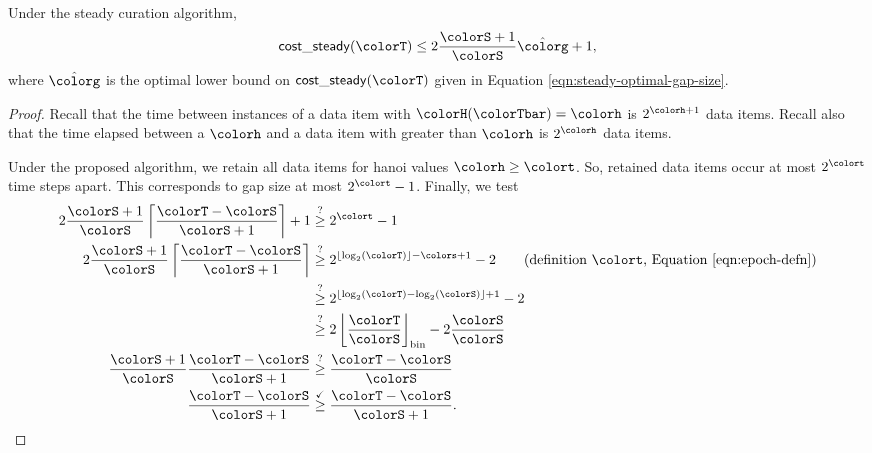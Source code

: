 \begin{theorem}
\label{thm:steady-gap-size}
Under the steady curation algorithm,
\begin{align*}
\mathsf{cost\_steady}(\colorT) \leq 2 \frac{\colorS + 1}{\colorS} \hat{\colorg} + 1,
\end{align*}
where $\hat{\colorg}$ is the optimal lower bound on $\mathsf{cost\_steady}(\colorT)$ given in Equation \ref{eqn:steady-optimal-gap-size}.
\end{theorem}
\begin{proof}
Recall that the time between instances of a data item with \hv{} $\colorH(\colorTbar) = \colorh$ is $2^{\colorh + 1}$ data items.
Recall also that the time elapsed between a \hv{} $\colorh$ and a data item with \hv{} greater than $\colorh$ is $2^{\colorh}$ data items.

Under the proposed algorithm, we retain all data items for hanoi values $\colorh \geq \colort$.
So, retained data items occur at most $2^{\colort}$ time steps apart.
This corresponds to gap size at most $2^{\colort} - 1$.
Finally, we test
\begin{align*}
2 \frac{\colorS + 1}{\colorS} \left\lceil \frac{\colorT - \colorS}{\colorS + 1} \right\rceil + 1
&\stackrel{?}{\geq}
2^{\colort} - 1\\
2 \frac{\colorS + 1}{\colorS} \left\lceil \frac{\colorT - \colorS}{\colorS + 1} \right\rceil
&\stackrel{?}{\geq}
2^{\left\lfloor \log_2(\colorT) \right\rfloor - \colors + 1} - 2 \tag{definition $\colort$, Equation \ref{eqn:epoch-defn}}\\
&\stackrel{?}{\geq}
2^{\left\lfloor \log_2(\colorT) - \log_2(\colorS) \right\rfloor + 1} - 2\\
&\stackrel{?}{\geq}
2\left\lfloor \frac{\colorT}{\colorS} \right\rfloor_{\mathrm{bin}} - 2\frac{\colorS}{\colorS}\\
\frac{\colorS + 1}{\colorS} \frac{\colorT - \colorS}{\colorS + 1}
&\stackrel{?}{\geq}
\frac{\colorT - \colorS}{\colorS}\\
\frac{\colorT - \colorS}{\colorS + 1}
&\stackrel{\checkmark}{\geq}
\frac{\colorT - \colorS}{\colorS + 1}.
\end{align*}
\end{proof}




